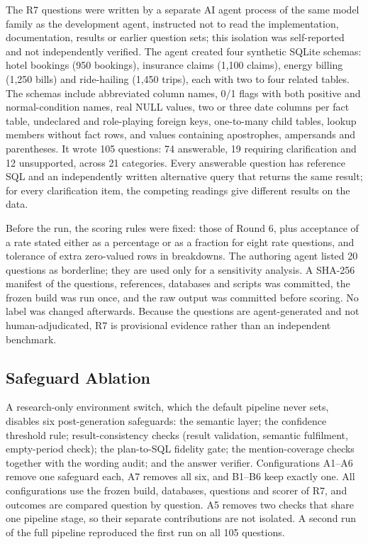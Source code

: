 \documentclass[conference]{IEEEtran}
\begin{document}
The R7 questions were written by a separate AI agent process of the same model family as the development agent, instructed not to read the implementation, documentation, results or earlier question sets; this isolation was self-reported and not independently verified. The agent created four synthetic SQLite schemas: hotel bookings (950 bookings), insurance claims (1,100 claims), energy billing (1,250 bills) and ride-hailing (1,450 trips), each with two to four related tables. The schemas include abbreviated column names, 0/1 flags with both positive and normal-condition names, real NULL values, two or three date columns per fact table, undeclared and role-playing foreign keys, one-to-many child tables, lookup members without fact rows, and values containing apostrophes, ampersands and parentheses. It wrote 105 questions: 74 answerable, 19 requiring clarification and 12 unsupported, across 21 categories. Every answerable question has reference SQL and an independently written alternative query that returns the same result; for every clarification item, the competing readings give different results on the data.

Before the run, the scoring rules were fixed: those of Round 6, plus acceptance of a rate stated either as a percentage or as a fraction for eight rate questions, and tolerance of extra zero-valued rows in breakdowns. The authoring agent listed 20 questions as borderline; they are used only for a sensitivity analysis. A SHA-256 manifest of the questions, references, databases and scripts was committed, the frozen build was run once, and the raw output was committed before scoring. No label was changed afterwards. Because the questions are agent-generated and not human-adjudicated, R7 is provisional evidence rather than an independent benchmark.

\subsection{Safeguard Ablation}

A research-only environment switch, which the default pipeline never sets, disables six post-generation safeguards: the semantic layer; the confidence threshold rule; result-consistency checks (result validation, semantic fulfilment, empty-period check); the plan-to-SQL fidelity gate; the mention-coverage checks together with the wording audit; and the answer verifier. Configurations A1--A6 remove one safeguard each, A7 removes all six, and B1--B6 keep exactly one. All configurations use the frozen build, databases, questions and scorer of R7, and outcomes are compared question by question. A5 removes two checks that share one pipeline stage, so their separate contributions are not isolated. A second run of the full pipeline reproduced the first run on all 105 questions.
\end{document}
